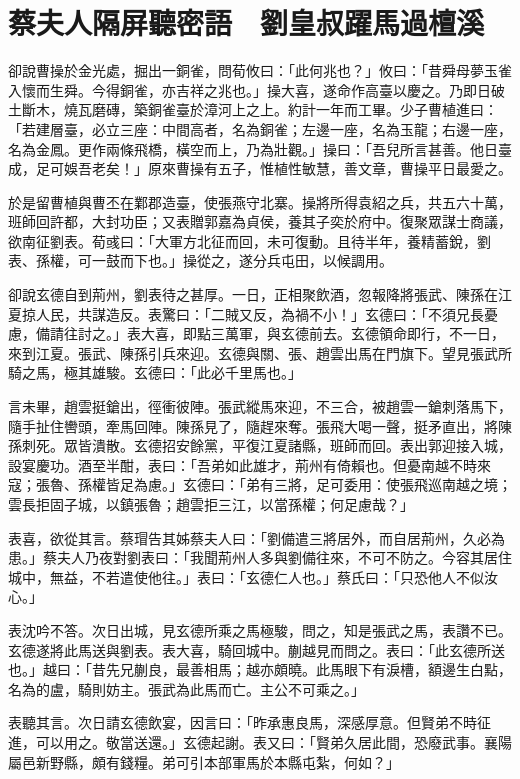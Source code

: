 
\chapter{蔡夫人隔屏聽密語　劉皇叔躍馬過檀溪}

卻說曹操於金光處，掘出一銅雀，問荀攸曰：「此何兆也？」攸曰：「昔舜母夢玉雀入懷而生舜。今得銅雀，亦吉祥之兆也。」操大喜，遂命作高臺以慶之。乃即日破土斷木，燒瓦磨磚，築銅雀臺於漳河上之上。約計一年而工畢。少子曹植進曰：「若建層臺，必立三座：中間高者，名為銅雀；左邊一座，名為玉龍；右邊一座，名為金鳳。更作兩條飛橋，橫空而上，乃為壯觀。」操曰：「吾兒所言甚善。他日臺成，足可娛吾老矣！」原來曹操有五子，惟植性敏慧，善文章，曹操平日最愛之。

於是留曹植與曹丕在鄴郡造臺，使張燕守北寨。操將所得袁紹之兵，共五六十萬，班師回許都，大封功臣；又表贈郭嘉為貞侯，養其子奕於府中。復聚眾謀士商議，欲南征劉表。荀彧曰：「大軍方北征而回，未可復動。且待半年，養精蓄銳，劉表、孫權，可一鼓而下也。」操從之，遂分兵屯田，以候調用。

卻說玄德自到荊州，劉表待之甚厚。一日，正相聚飲酒，忽報降將張武、陳孫在江夏掠人民，共謀造反。表驚曰：「二賊又反，為禍不小！」玄德曰：「不須兄長憂慮，備請往討之。」表大喜，即點三萬軍，與玄德前去。玄德領命即行，不一日，來到江夏。張武、陳孫引兵來迎。玄德與關、張、趙雲出馬在門旗下。望見張武所騎之馬，極其雄駿。玄德曰：「此必千里馬也。」

言未畢，趙雲挺鎗出，徑衝彼陣。張武縱馬來迎，不三合，被趙雲一鎗刺落馬下，隨手扯住轡頭，牽馬回陣。陳孫見了，隨趕來奪。張飛大喝一聲，挺矛直出，將陳孫刺死。眾皆潰散。玄德招安餘黨，平復江夏諸縣，班師而回。表出郭迎接入城，設宴慶功。酒至半酣，表曰：「吾弟如此雄才，荊州有倚賴也。但憂南越不時來寇；張魯、孫權皆足為慮。」玄德曰：「弟有三將，足可委用：使張飛巡南越之境；雲長拒固子城，以鎮張魯；趙雲拒三江，以當孫權；何足慮哉？」

表喜，欲從其言。蔡瑁告其姊蔡夫人曰：「劉備遣三將居外，而自居荊州，久必為患。」蔡夫人乃夜對劉表曰：「我聞荊州人多與劉備往來，不可不防之。今容其居住城中，無益，不若遣使他往。」表曰：「玄德仁人也。」蔡氏曰：「只恐他人不似汝心。」

表沈吟不答。次日出城，見玄德所乘之馬極駿，問之，知是張武之馬，表讚不已。玄德遂將此馬送與劉表。表大喜，騎回城中。蒯越見而問之。表曰：「此玄德所送也。」越曰：「昔先兄蒯良，最善相馬；越亦頗曉。此馬眼下有淚槽，額邊生白點，名為的盧，騎則妨主。張武為此馬而亡。主公不可乘之。」

表聽其言。次日請玄德飲宴，因言曰：「昨承惠良馬，深感厚意。但賢弟不時征進，可以用之。敬當送還。」玄德起謝。表又曰：「賢弟久居此間，恐廢武事。襄陽屬邑新野縣，頗有錢糧。弟可引本部軍馬於本縣屯紮，何如？」

